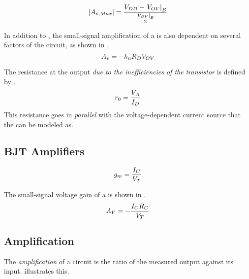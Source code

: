 \begin{equation}\label{eq:MOSFET-Small_Signal_Voltage_Gain-Max}
  \Abs{\Amp{\Voltage,Max}} = \frac{\DCVoltage{DD} - \left. \OverdriveVoltage \right\rvert_{B}}{\frac{\left. \OverdriveVoltage \right\rvert_{B}}{2}}
\end{equation}

In addition to , the small-signal amplification of a  is also dependent on several factors of the circuit, as shown in .
\begin{equation}\label{eq:MOSFET-Small_Signal_Voltage_Gain-Overdrive_Voltage}
  A_{v} = -k_{n} R_{D} V_{OV}
\end{equation}

The resistance at the output \emph{due to the inefficiencies of the transistor} is defined by .
\begin{equation}\label{eq:MOSFET-Transistor_Resistance}
  r_{0} = \frac{\DCVoltage{A}}{\DCCurrent{\Drain}}
\end{equation}
This resistance goes in \emph{parallel} with the voltage-dependent current source that the  can be modeled as.

\subsection{BJT Amplifiers}\label{subsec:BJT_Amps}
\begin{equation}\label{eq:BJT-Transconductance_Gain}
  \TransconductanceGain = \frac{\DCCurrent{\Collector}}{\ThermalVoltage}
\end{equation}

The small-signal voltage gain of a  is shown in .
\begin{equation}\label{eq:BJT-Small_Signal_Voltage_Gain}
  \Amp{V} = - \frac{\DCCurrent{\Collector} R_{\Collector}}{\ThermalVoltage}
\end{equation}

\subsection{Amplification}\label{subsec:Amplification}
The \emph{amplification} of a circuit is the ratio of the measured output against its input.
 illustrates this.

